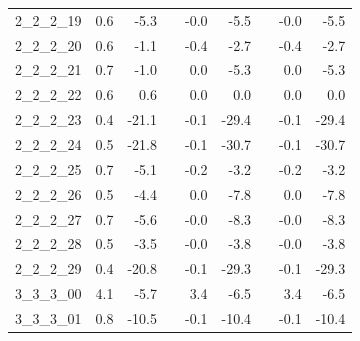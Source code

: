 \begin{longtable}{lrrcrrcrr}
2\_2\_2\_19      &                 0.6 &                  -5.3 &&                 -0.0 &                   -5.5 &&                 -0.0 &                   -5.5 \\
2\_2\_2\_20      &                 0.6 &                  -1.1 &&                 -0.4 &                   -2.7 &&                 -0.4 &                   -2.7 \\
2\_2\_2\_21      &                 0.7 &                  -1.0 &&                  0.0 &                   -5.3 &&                  0.0 &                   -5.3 \\
2\_2\_2\_22      &                 0.6 &                   0.6 &&                  0.0 &                    0.0 &&                  0.0 &                    0.0 \\
2\_2\_2\_23      &                 0.4 &                 -21.1 &&                 -0.1 &                  -29.4 &&                 -0.1 &                  -29.4 \\
2\_2\_2\_24      &                 0.5 &                 -21.8 &&                 -0.1 &                  -30.7 &&                 -0.1 &                  -30.7 \\
2\_2\_2\_25      &                 0.7 &                  -5.1 &&                 -0.2 &                   -3.2 &&                 -0.2 &                   -3.2 \\
2\_2\_2\_26      &                 0.5 &                  -4.4 &&                  0.0 &                   -7.8 &&                  0.0 &                   -7.8 \\
2\_2\_2\_27      &                 0.7 &                  -5.6 &&                 -0.0 &                   -8.3 &&                 -0.0 &                   -8.3 \\
2\_2\_2\_28      &                 0.5 &                  -3.5 &&                 -0.0 &                   -3.8 &&                 -0.0 &                   -3.8 \\
2\_2\_2\_29      &                 0.4 &                 -20.8 &&                 -0.1 &                  -29.3 &&                 -0.1 &                  -29.3 \\
3\_3\_3\_00      &                 4.1 &                  -5.7 &&                  3.4 &                   -6.5 &&                  3.4 &                   -6.5 \\
3\_3\_3\_01      &                 0.8 &                 -10.5 &&                 -0.1 &                  -10.4 &&                 -0.1 &                  -10.4 \\

\end{longtable}
